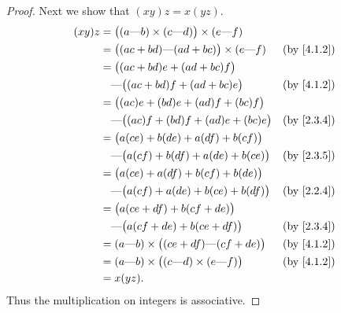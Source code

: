 \begin{proof}
  Next we show that \((xy)z = x(yz)\).
  \begin{align*}
    (xy)z & = \big((a \text{---} b) \times (c \text{---} d)\big) \times (e \text{---} f)                            \\
          & = \big((ac + bd) \text{---} (ad + bc)\big) \times (e \text{---} f)           & \text{(by \cref{4.1.2})} \\
          & = \big((ac + bd)e + (ad + bc)f\big)                                                                     \\
          & \quad \text{---} \big((ac + bd)f + (ad + bc)e\big)                           & \text{(by \cref{4.1.2})} \\
          & = \big((ac)e + (bd)e + (ad)f + (bc)f\big)                                                               \\
          & \quad \text{---} \big((ac)f + (bd)f + (ad)e + (bc)e\big)                     & \text{(by \cref{2.3.4})} \\
          & = \big(a(ce) + b(de) + a(df) + b(cf)\big)                                                               \\
          & \quad \text{---} \big(a(cf) + b(df) + a(de) + b(ce)\big)                     & \text{(by \cref{2.3.5})} \\
          & = \big(a(ce) + a(df) + b(cf) + b(de)\big)                                                               \\
          & \quad \text{---} \big(a(cf) + a(de) + b(ce) + b(df)\big)                     & \text{(by \cref{2.2.4})} \\
          & = \big(a(ce + df) + b(cf + de)\big)                                                                     \\
          & \quad \text{---} \big(a(cf + de) + b(ce + df)\big)                           & \text{(by \cref{2.3.4})} \\
          & = (a \text{---} b) \times \big((ce + df) \text{---} (cf + de)\big)           & \text{(by \cref{4.1.2})} \\
          & = (a \text{---} b) \times \big((c \text{---} d) \times (e \text{---} f)\big) & \text{(by \cref{4.1.2})} \\
          & = x(yz).
  \end{align*}
  Thus the multiplication on integers is associative.


\end{proof}
